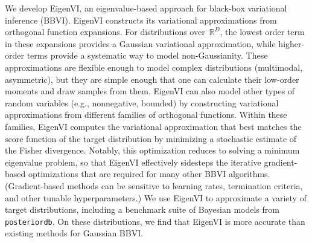 We develop EigenVI, an eigenvalue-based approach for black-box variational inference (BBVI). EigenVI constructs its variational approximations from orthogonal function expansions. For distributions over~$\mathbb{R}^D$, the lowest order term in these expansions provides a Gaussian variational approximation, while higher-order terms provide a systematic way to model non-Gaussianity. These approximations are flexible enough to model complex distributions (multimodal, asymmetric), but they are simple enough that one can calculate their low-order moments and draw samples from them. EigenVI can also model other types of random variables (e.g., nonnegative, bounded) by constructing variational approximations from different families of orthogonal functions. Within these families, EigenVI computes the variational approximation that best matches the score function of the target distribution by minimizing a stochastic estimate of the Fisher divergence. Notably, this optimization reduces to solving a minimum eigenvalue problem, so that EigenVI effectively sidesteps the iterative gradient-based optimizations that are required for many other BBVI algorithms. (Gradient-based methods can be sensitive to learning rates, termination criteria, and other tunable hyperparameters.) We use EigenVI to approximate a variety of target distributions, including a benchmark suite of Bayesian models from \texttt{posteriordb}. On these distributions, we find that EigenVI is more accurate than existing methods for Gaussian BBVI.

